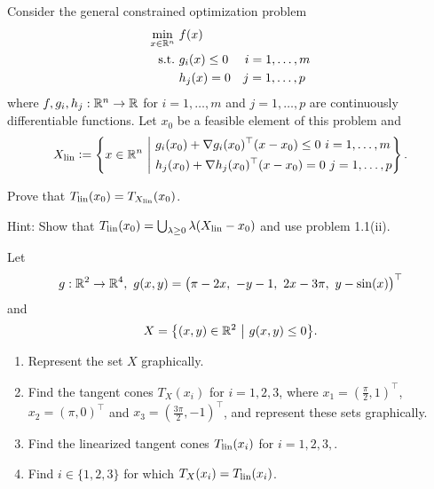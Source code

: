 \begin{problem}
    Consider the general constrained optimization problem
    \begin{align*}
        \min_{x \in \mathbb{R}^n} \ & f(x) \\
        \mathrm{s.t.} \ & g_i(x) \le 0 \quad \ i = 1, \dots, m \\
        & h_j(x) = 0 \quad j = 1, \dots, p
    \end{align*}
    where \(f, g_i, h_j : \mathbb{R}^n \to \mathbb{R}\) for \(i = 1, \dots, m\) and \(j = 1, \dots, p\) are continuously differentiable functions.
    Let \(x_0\) be a feasible element of this problem and
    \[X_{\lin} \defeq \left\{ x \in \R^n \ \middle| \ \begin{aligned} & g_i(x_0) + \nabla g_i(x_0)^\top (x - x_0) \le 0 \ i = 1, \dots, m \\ & h_j(x_0) + \nabla h_j(x_0)^\top (x - x_0) = 0 \ j = 1, \dots, p \end{aligned} \right\}.\]

    Prove that \(T_{\operatorname{lin}}(x_0) = T_{X_{\operatorname{lin}}}(x_0)\).

    Hint: Show that \(T_{\operatorname{lin}}(x_0) = \bigcup_{\lambda \ge 0} \lambda (X_{\operatorname{lin}} - x_0)\) and use problem 1.1(ii).
\end{problem}

\begin{solution}
    
\end{solution}

\begin{problem}
    Let
    \[g : \mathbb{R}^2 \to \mathbb{R}^4 ,\ g(x,y) = \big(\pi-2x ,\ -y-1 ,\ 2x-3\pi ,\ y-\sin(x)\big)^\top\]
    and
    \[X = \big\{ (x,y) \in \mathbb{R}^2 \ \big| \ g(x,y) \le 0 \big\}.\]

    \begin{enumerate}
        \item Represent the set \(X\) graphically.
        \item Find the tangent cones \(T_X(x_i)\) for \(i = 1, 2, 3\), where \(x_1 = (\frac{\pi}{2}, 1)^\top\), \(x_2 = (\pi, 0)^\top\) and \(x_3 = (\frac{3\pi}{2}, -1)^\top\), and represent these sets graphically.
        \item Find the linearized tangent cones \(T_{\operatorname{lin}}(x_i)\) for \(i = 1,2,3,\).
        \item Find \(i \in \{1,2,3\}\) for which \(T_X(x_i) = T_{\operatorname{lin}}(x_i)\).
    \end{enumerate}
\end{problem}

